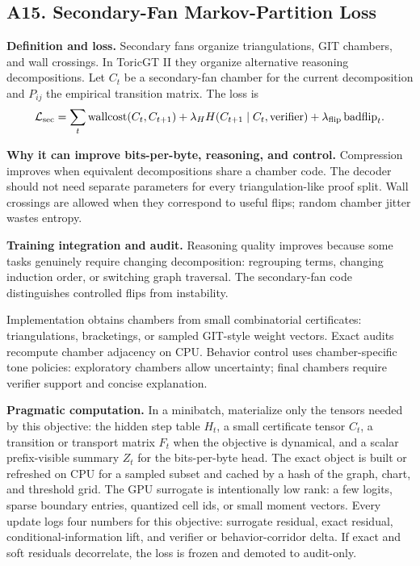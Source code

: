 \documentclass[10pt]{article}
\newcommand{\loss}{\mathcal{L}}
\numberwithin{equation}{section}
\begin{document}
\subsection{A15. Secondary-Fan Markov-Partition Loss}
\noindent\textbf{Definition and loss.} Secondary fans organize triangulations, GIT chambers, and wall crossings. In ToricGT II they organize alternative reasoning decompositions. Let $C_t$ be a secondary-fan chamber for the current decomposition and $P_{ij}$ the empirical transition matrix. The loss is
\[
\loss_{\rm sec}=\sum_t \mathrm{wallcost}(C_t,C_{t+1})+\lambda_H H(C_{t+1}\mid C_t,\mathrm{verifier})+\lambda_{\rm flip}\,\mathrm{badflip}_t.
\]

\noindent\textbf{Why it can improve bits-per-byte, reasoning, and control.} Compression improves when equivalent decompositions share a chamber code. The decoder should not need separate parameters for every triangulation-like proof split. Wall crossings are allowed when they correspond to useful flips; random chamber jitter wastes entropy.

\noindent\textbf{Training integration and audit.} Reasoning quality improves because some tasks genuinely require changing decomposition: regrouping terms, changing induction order, or switching graph traversal. The secondary-fan code distinguishes controlled flips from instability.

Implementation obtains chambers from small combinatorial certificates: triangulations, bracketings, or sampled GIT-style weight vectors. Exact audits recompute chamber adjacency on CPU. Behavior control uses chamber-specific tone policies: exploratory chambers allow uncertainty; final chambers require verifier support and concise explanation.

\noindent\textbf{Pragmatic computation.} In a minibatch, materialize only the tensors needed by this objective: the hidden step table $H_t$, a small certificate tensor $C_t$, a transition or transport matrix $F_t$ when the objective is dynamical, and a scalar prefix-visible summary $Z_t$ for the bits-per-byte head. The exact object is built or refreshed on CPU for a sampled subset and cached by a hash of the graph, chart, and threshold grid. The GPU surrogate is intentionally low rank: a few logits, sparse boundary entries, quantized cell ids, or small moment vectors. Every update logs four numbers for this objective: surrogate residual, exact residual, conditional-information lift, and verifier or behavior-corridor delta. If exact and soft residuals decorrelate, the loss is frozen and demoted to audit-only.
\end{document}
